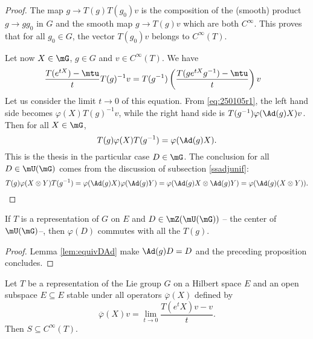 \begin{proof}
The map $g\to T(g)T(g_0)v$ is the composition of the (smooth) product $g\to gg_0$ in $G$ and the smooth map $g\to T(g)v$ which are both $ C^{\infty}$. This proves that for all $g_0\in G$, the vector $T(g_0)v$ belongs to $C^{\infty}(T)$.

Let now $X\in\mG$, $g\in G$ and $v\in C^{\infty}(T)$. We have
\begin{equation}
\begin{split}
  \frac{T(e^{tX})-\mtu}{t}T(g)^{-1}v&=T(g^{-1})\left( \frac{T(ge^{tX}g^{-1})-\mtu}{t} \right)v
\end{split}
\end{equation}
Let us consider the limit $t\to 0$ of this equation. From \eqref{eq:250105r1}, the left hand side becomes $\varphi(X)T(g)^{-1}v$, while the right hand side is $T(g^{-1})\varphi(\Ad(g)X)v$. Then for all $X\in\mG$,
\begin{equation}
  T(g)\varphi(X)T(g^{-1})=\varphi(\Ad(g)X).
\end{equation}
This is the thesis in the particular case $D\in\mG$. The conclusion for all $D\in\mU(\mG)$ comes from the discussion of subsection \ref{ssadjunif}:
\begin{equation}
   T(g)\varphi(X\otimes Y)T(g^{-1})=\varphi(\Ad(g)X)\varphi(\Ad(g)Y)
			=\varphi(\Ad(g)X\otimes\Ad(g)Y)
			=\varphi(\Ad(g)(X\otimes Y)).
\end{equation}
\end{proof}

\begin{corollary}
If $T$ is a representation of $G$ on $E$ and $D\in\mZ(\mU(\mG))$ -- the center of $\mU(\mG)$--, then $\varphi(D)$ commutes with all the $T(g)$.
\end{corollary} 

\begin{proof}
Lemma \ref{lem:equivDAd} make $\Ad(g)D=D$ and the preceding proposition concludes. 
\end{proof}

\begin{proposition}
Let $T$ be a representation of the Lie group $G$ on a Hilbert space $E$ and an open subspace $E\subseteq E$ stable under all operators $\overline{ \varphi }(X)$ defined by
\begin{equation} \label{eq:ovlphilim}
\overline{ \varphi }(X)v=\lim_{t\to 0}\frac{ T(e^tX)v-v }{ t }.
\end{equation}
Then $S\subseteq  C^{\infty}(T)$.
\end{proposition}

